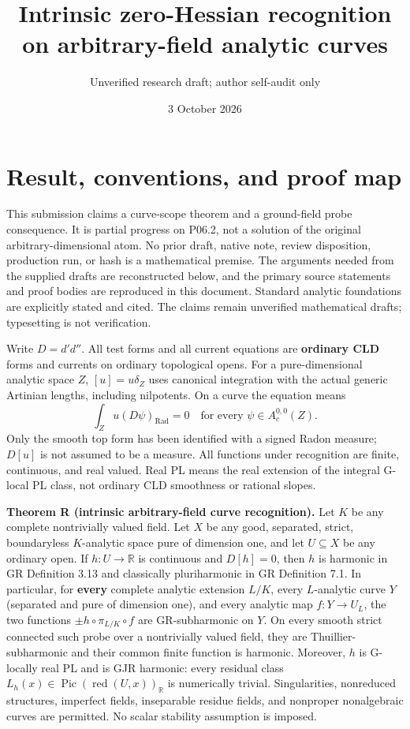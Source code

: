 \documentclass[
  10pt,
]{article}
\title{Intrinsic zero-Hessian recognition on arbitrary-field analytic
curves}
\author{Unverified research draft; author self-audit only}
\date{3 October 2026}
\begin{document}
\maketitle

\section{Result, conventions, and proof
map}\label{result-conventions-and-proof-map}

This submission claims a curve-scope theorem and a ground-field probe
consequence. It is partial progress on P06.2, not a solution of the
original arbitrary-dimensional atom. No prior draft, native note, review
disposition, production run, or hash is a mathematical premise. The
arguments needed from the supplied drafts are reconstructed below, and
the primary source statements and proof bodies are reproduced in this
document. Standard analytic foundations are explicitly stated and cited.
The claims remain unverified mathematical drafts; typesetting is not
verification.

Write \(D=d'd''\). All test forms and all current equations are
\textbf{ordinary CLD} forms and currents on ordinary topological opens.
For a pure-dimensional analytic space \(Z\), \([u]=u\delta_Z\) uses
canonical integration with the actual generic Artinian lengths,
including nilpotents. On a curve the equation means \[
             \int_Z u(D\psi)_{\mathrm{Rad}}=0
             \quad\text{for every }\psi\in A_c^{0,0}(Z).
\] Only the smooth top form has been identified with a signed Radon
measure; \(D[u]\) is not assumed to be a measure. All functions under
recognition are finite, continuous, and real valued. Real PL means the
real extension of the integral G-local PL class, not ordinary CLD
smoothness or rational slopes.

\textbf{Theorem R (intrinsic arbitrary-field curve recognition).} Let
\(K\) be any complete nontrivially valued field. Let \(X\) be any good,
separated, strict, boundaryless \(K\)-analytic space pure of dimension
one, and let \(U\subseteq X\) be any ordinary open. If
\(h:U\to\mathbb R\) is continuous and \(D[h]=0\), then \(h\) is harmonic
in GR Definition 3.13 and classically pluriharmonic in GR Definition
7.1. In particular, for \textbf{every} complete analytic extension
\(L/K\), every \(L\)-analytic curve \(Y\) (separated and pure of
dimension one), and every analytic map \(f:Y\to U_L\), the two functions
\(\pm h\circ\pi_{L/K}\circ f\) are GR-subharmonic on \(Y\). On every
smooth strict connected such probe over a nontrivially valued field,
they are Thuillier-subharmonic and their common finite function is
harmonic. Moreover, \(h\) is G-locally real PL and is GJR harmonic:
every residual class
\(L_h(x)\in\operatorname{Pic}(\operatorname{red}(U,x))_{\mathbb R}\) is
numerically trivial. Singularities, nonreduced structures, imperfect
fields, inseparable residue fields, and nonproper nonalgebraic curves
are permitted. No scalar stability assumption is imposed.
\end{document}
